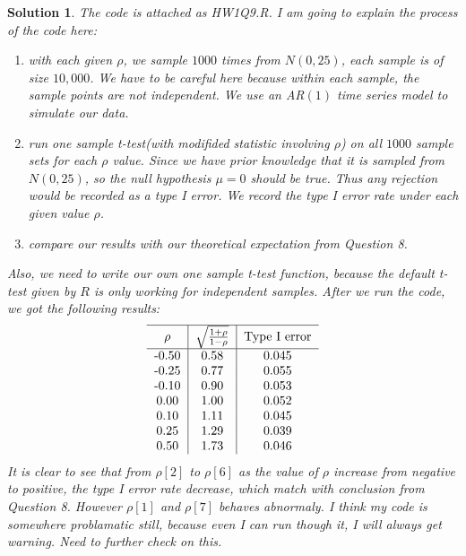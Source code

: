 \documentclass[11pt]{article}
\newtheorem{sol}{Solution}
\begin{document}
\begin{sol}
	The code is attached as HW1Q9.R. I am going to explain the process of the code here:\vskip 2mm
	\begin{enumerate}
		\item with each given $\rho$, we sample $1000$ times from $N(0, 25)$, each sample is of size $10,000$. We have to be careful here because within each sample, the sample points are not independent. We use an AR$(1)$ time series model to simulate our data.
		\item run one sample t-test(with modifided statistic involving $\rho$) on all $1000$ sample sets for each $\rho$ value. Since we have prior knowledge that it is sampled from $N(0, 25)$, so the null hypothesis $\mu = 0$ should be true. Thus any rejection would be recorded as a type I error. We record the type I error rate under each given value $\rho$. 
		\item compare our results with our theoretical expectation from Question 8.
	\end{enumerate}\vskip 2mm
	Also, we need to write our own one sample t-test function, because the default t-test given by $R$ is only working for independent samples.\vskip 2mm
	After we run the code, we got the following results:
	\begin{align*}
		\begin{tabular}{c|c|c}
		\hline
		$\rho$ &$\sqrt{\frac{1 + \rho}{1 - \rho}}$& Type I error\\
		\hline
		-0.50&0.58& 0.045\\
		-0.25&0.77&0.055\\
		-0.10&0.90&0.053\\
		0.00&1.00&0.052\\
		0.10&1.11&0.045\\
		0.25&1.29&0.039\\
		0.50&1.73&0.046
		\end{tabular}
	\end{align*}
	It is clear to see that from $\rho[2]$ to $\rho[6]$ as the value of $\rho$ increase from negative to positive, the type I error rate decrease, which match with conclusion from Question 8. However $\rho[1]$ and $\rho[7]$ behaves abnormaly. I think my code is somewhere problamatic still, because even I can run though it, I will always get warning. Need to further check on this.
\end{sol}
\end{document}
